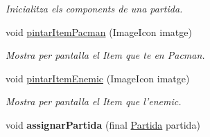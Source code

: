 \begin{DoxyCompactItemize}
\begin{DoxyCompactList}\small\item\em Inicialitza els components de una partida. \end{DoxyCompactList}\item 
void \hyperlink{classinterficie_1_1_f_partida_aaaa9cf72ac9c6e237d13e823d20bcb93}{pintar\+Item\+Pacman} (Image\+Icon imatge)
\begin{DoxyCompactList}\small\item\em Mostra per pantalla el Item que te en Pacman. \end{DoxyCompactList}\item 
void \hyperlink{classinterficie_1_1_f_partida_a5b079601d2de0f3a1234d4e61fc8460c}{pintar\+Item\+Enemic} (Image\+Icon imatge)
\begin{DoxyCompactList}\small\item\em Mostra per pantalla el Item que l'enemic. \end{DoxyCompactList}\item 
\hypertarget{classinterficie_1_1_f_partida_a4171c2e25f5868e1422cccf7f8018dbc}{void {\bfseries assignar\+Partida} (final \hyperlink{classlogica_1_1_partida}{Partida} partida)}\label{classinterficie_1_1_f_partida_a4171c2e25f5868e1422cccf7f8018dbc}

\end{DoxyCompactItemize}
